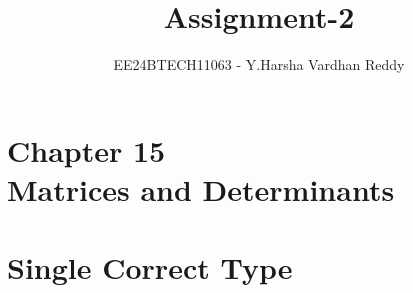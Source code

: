 \documentclass[journal,,12pt,onecolumn]{IEEEtran}
\theoremstyle{remark}
\begin{document}

\vspace{3cm}

\title{Assignment-2}
\author{EE24BTECH11063 - Y.Harsha Vardhan Reddy}
\maketitle

\bigskip

\renewcommand{\thefigure}{\theenumi}
\renewcommand{\thetable}{\theenumi}
\section*{Chapter 15\\Matrices and Determinants}
\section*{Single Correct Type}
\end{document}

